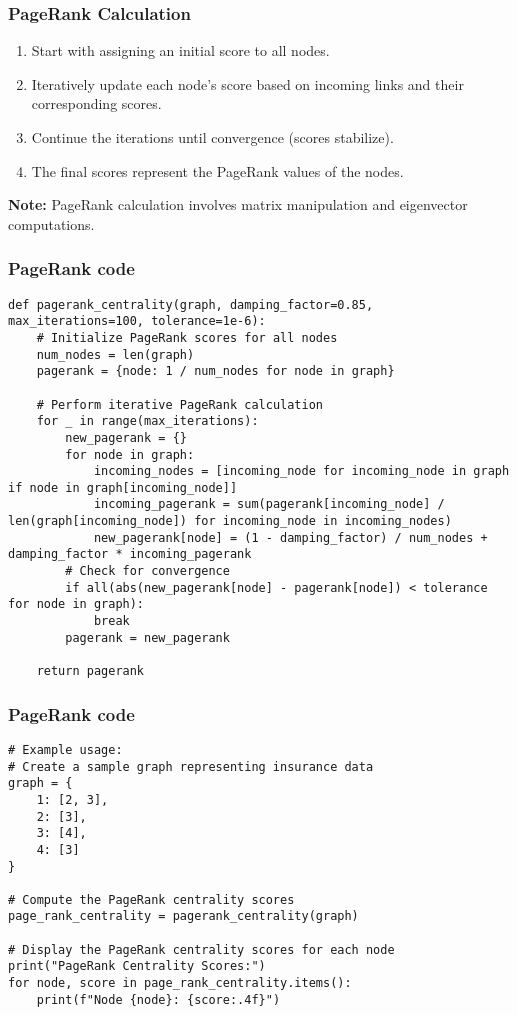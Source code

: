 \begin{frame}[fragile]\frametitle{PageRank Calculation}
\begin{enumerate}
\item Start with assigning an initial score to all nodes.
\item Iteratively update each node's score based on incoming links and their corresponding scores.
\item Continue the iterations until convergence (scores stabilize).
\item The final scores represent the PageRank values of the nodes.
\end{enumerate}

\textbf{Note:} PageRank calculation involves matrix manipulation and eigenvector computations.
\end{frame}

\begin{frame}[fragile]\frametitle{PageRank code}
{\tiny
\begin{lstlisting}
def pagerank_centrality(graph, damping_factor=0.85, max_iterations=100, tolerance=1e-6):
    # Initialize PageRank scores for all nodes
    num_nodes = len(graph)
    pagerank = {node: 1 / num_nodes for node in graph}

    # Perform iterative PageRank calculation
    for _ in range(max_iterations):
        new_pagerank = {}
        for node in graph:
            incoming_nodes = [incoming_node for incoming_node in graph if node in graph[incoming_node]]
            incoming_pagerank = sum(pagerank[incoming_node] / len(graph[incoming_node]) for incoming_node in incoming_nodes)
            new_pagerank[node] = (1 - damping_factor) / num_nodes + damping_factor * incoming_pagerank
        # Check for convergence
        if all(abs(new_pagerank[node] - pagerank[node]) < tolerance for node in graph):
            break
        pagerank = new_pagerank
		
    return pagerank

\end{lstlisting}
}

\end{frame}


\begin{frame}[fragile]\frametitle{PageRank code}
{\tiny
\begin{lstlisting}
# Example usage:
# Create a sample graph representing insurance data
graph = {
    1: [2, 3],
    2: [3],
    3: [4],
    4: [3]
}

# Compute the PageRank centrality scores
page_rank_centrality = pagerank_centrality(graph)

# Display the PageRank centrality scores for each node
print("PageRank Centrality Scores:")
for node, score in page_rank_centrality.items():
    print(f"Node {node}: {score:.4f}")

\end{lstlisting}
}

\end{frame}


